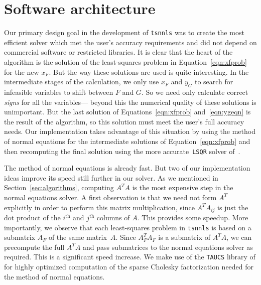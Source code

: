 \documentclass[acmtoms,acmnow,aps,floatfix]{acmtrans2m}
\renewcommand{\subsection}[1]{\medskip\noindent\textbf{#1.} }
\newcommand{\tsnnls}{\texttt{tsnnls} }
\begin{document}

\section{Software architecture}

Our primary design goal in the development of \tsnnls was to create the most efficient solver which met the user's accuracy requirements and did not depend on commercial software or restricted libraries. It is clear that the heart of the algorithm is the solution of the least-squares problem in Equation~\ref{eqn:xfprob} for the new $x_F$. But the way these solutions are used is quite interesting. In the intermediate stages of the calculation, we only use $x_F$ and $y_G$ to search for infeasible variables to shift between $F$ and $G$. So we need only calculate correct \textit{signs} for all the variables--- beyond this the numerical quality of these solutions is unimportant. But the last solution of Equations~\ref{eqn:xfprob} and~\ref{eqn:ygeqn} is the result of the algorithm, so this solution must meet the user's full accuracy needs. Our implementation takes advantage of this situation by using the method of normal equations for the intermediate solutions of Equation~\ref{eqn:xfprob} and then recomputing the final solution using the more accurate~\texttt{LSQR} solver of~\cite{355989}. 

The method of normal equations is already fast. But two of our implementation ideas improve its speed still further in our solver. As we mentioned in Section~\ref{sec:algorithms}, computing $A^{T}\!A$ is the most expensive step in the normal equations solver. A first observation is that we need not form $A^T$ explicitly in order to perform this matrix multiplication, since $A^T\!A_{ij}$ is just the dot product of the $i^{\text{th}}$ and $j^{\text{th}}$ columns of $A$. This provides some speedup. More importantly, we observe that each least-squares problem in \tsnnls is based on a submatrix $A_F$ of the same matrix~$A$. Since $A_F^T\!A_F$ is a submatrix of $A^T\!A$, we can precompute the full $A^T\!A$ and pass submatrices to the normal equations solver as required. This is a significant speed increase.
We make use of the \texttt{TAUCS} library of \cite{taucs} for highly optimized computation of the sparse Cholesky factorization needed for the method of normal equations.
\end{document}
